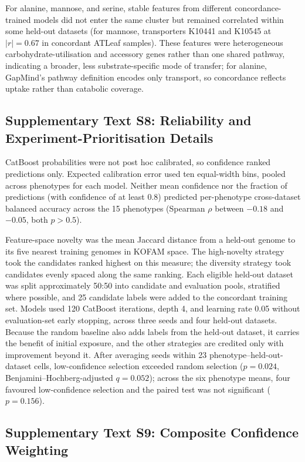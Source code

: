 For alanine, mannose, and serine, stable features from different concordance-trained models did not enter the same cluster but remained correlated within some held-out datasets (for mannose, transporters K10441 and K10545 at $|r|=0.67$ in concordant ATLeaf samples).
These features were heterogeneous carbohydrate-utilisation and accessory genes rather than one shared pathway, indicating a broader, less substrate-specific mode of transfer; for alanine, GapMind's pathway definition encodes only transport, so concordance reflects uptake rather than catabolic coverage.

\subsection*{Supplementary Text S8: Reliability and Experiment-Prioritisation Details}

CatBoost probabilities were not post hoc calibrated, so confidence ranked predictions only.
Expected calibration error used ten equal-width bins, pooled across phenotypes for each model.
Neither mean confidence nor the fraction of predictions (with confidence of at least 0.8) predicted per-phenotype cross-dataset balanced accuracy across the 15 phenotypes (Spearman $\rho$ between $-0.18$ and $-0.05$, both $p > 0.5$).

Feature-space novelty was the mean Jaccard distance from a held-out genome to its five nearest training genomes in KOFAM space.
The high-novelty strategy took the candidates ranked highest on this measure; the diversity strategy took candidates evenly spaced along the same ranking.
Each eligible held-out dataset was split approximately 50:50 into candidate and evaluation pools, stratified where possible, and 25 candidate labels were added to the concordant training set.
Models used 120 CatBoost iterations, depth 4, and learning rate 0.05 without evaluation-set early stopping, across three seeds and four held-out datasets.
Because the random baseline also adds labels from the held-out dataset, it carries the benefit of initial exposure, and the other strategies are credited only with improvement beyond it.
After averaging seeds within 23 phenotype--held-out-dataset cells, low-confidence selection exceeded random selection ($p=0.024$, Benjamini--Hochberg-adjusted $q=0.052$); across the six phenotype means, four favoured low-confidence selection and the paired test was not significant ($p=0.156$).

\subsection*{Supplementary Text S9: Composite Confidence Weighting}

